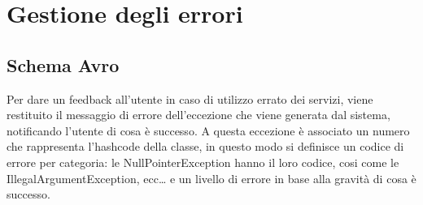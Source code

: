 \section{Gestione degli errori}
\subsection{Schema Avro}
\begin{center}
		{\selectfont
			
		}
\end{center}

Per dare un feedback all’utente in caso di utilizzo errato dei servizi, viene restituito il messaggio di errore dell’eccezione che viene generata dal sistema, notificando l’utente di cosa è successo. A questa eccezione è associato un numero che rappresenta l’hashcode della classe, in questo modo si definisce un codice di errore per categoria: le NullPointerException hanno il loro codice, cosi come le IllegalArgumentException, ecc… e un livello di errore in base alla gravità di cosa è successo.

